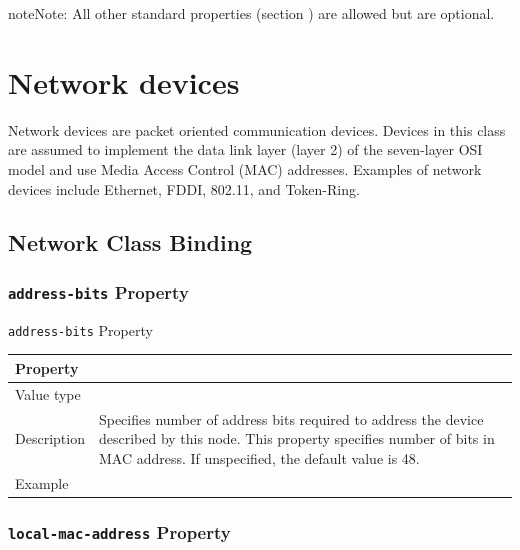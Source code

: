 \documentclass[a4paper,10pt,oneside]{sphinxmanual}
\begin{document}
\begin{notice}{note}{Note:}
All other standard properties (section
{\hyperref[devicetree\string-basics:sect\string-standard\string-properties]{}}) are allowed but are optional.
\end{notice}


\section{Network devices}
\label{device-bindings:network-devices}
Network devices are packet oriented communication devices. Devices in
this class are assumed to implement the data link layer (layer 2) of the
seven-layer OSI model and use Media Access Control (MAC) addresses.
Examples of network devices include Ethernet, FDDI, 802.11, and
Token-Ring.


\subsection{Network Class Binding}
\label{device-bindings:network-class-binding}

\subsubsection{\texttt{address-bits} Property}
\label{device-bindings:address-bits-property}

\begin{threeparttable}
\capstart\caption{\texttt{address-bits} Property}\label{device-bindings:id8}
\begin{tabulary}{\linewidth}{l J}
\hline
\textsf{\relax 
Property
} & \textsf{\relax 
{}
}\\
\hline
Value type
 & 
\\
\hline
Description
 & 
Specifies number of address bits required to address the
device described by this node. This property specifies number
of bits in MAC address. If unspecified, the default value is 48.
\\
\hline
Example
 & 
\\
\hline\end{tabulary}

\end{threeparttable}



\subsubsection{\texttt{local-mac-address} Property}
\label{device-bindings:local-mac-address-property}
\end{document}
